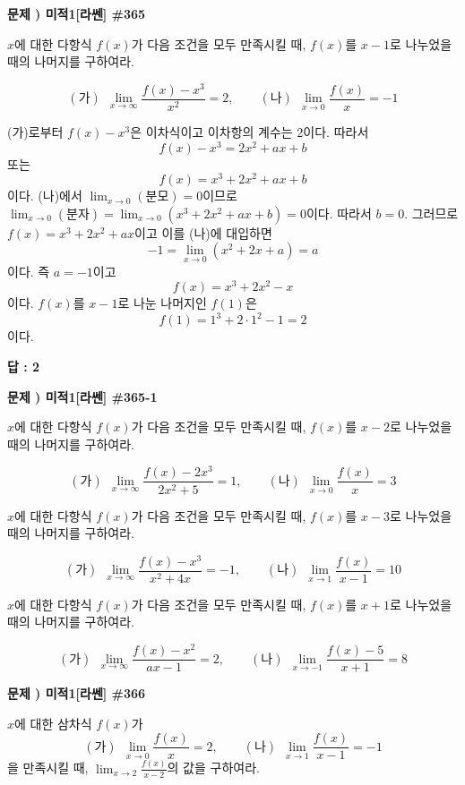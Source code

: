 \documentclass[a4paper]{oblivoir}
\newcounter{num}
\newcommand\prob[1]
{\bigskip\par\noindent\stepcounter{num} \textbf{문제 \thenum) #1}\par\noindent}
\newcommand\vs[1]{\vspace{60pt}}
\begin{document}
\clearpage
%
\prob{미적1[라쎈] \#365}
\(x\)에 대한 다항식 \(f(x)\)가 다음 조건을 모두 만족시킬 때, \(f(x)\)를 \(x-1\)로 나누었을 때의 나머지를 구하여라.
\begin{mdframed}
\[
(가)\:\:\lim_{x\to\infty}\frac{f(x)-x^3}{x^2}=2,\qquad
(나)\:\:\lim_{x\to0}\frac{f(x)}x=-1
\]
\end{mdframed}
\begin{mdframed}[frametitle=<풀이>]
(가)로부터 \(f(x)-x^3\)은 이차식이고 이차항의 계수는 2이다.
따라서 \[f(x)-x^3=2x^2+ax+b\]
또는
\[f(x)=x^3+2x^2+ax+b\tag{3}\]
이다.
(나)에서 \(\displaystyle\lim_{x\to0}(분모)=0\)이므로
\(\displaystyle\lim_{x\to0}(분자)=\lim_{x\to0}(x^3+2x^2+ax+b)=0\)이다.
따라서 \(b=0\).
그러므로 \(f(x)=x^3+2x^2+ax\)이고 이를 (나)에 대입하면
\[-1=\lim_{x\to0}(x^2+2x+a)=a\]
이다.
즉 \(a=-1\)이고
\[f(x)=x^3+2x^2-x\]
이다. \(f(x)\)를 \(x-1\)로 나눈 나머지인 \(f(1)\)은
\[f(1)=1^3+2\cdot1^2-1=2\]
이다.
\end{mdframed}
{\par
\raggedleft\textbf{답 : 2}
\par}\bigskip

\clearpage
%
\prob{미적1[라쎈] \#365-1}
\(x\)에 대한 다항식 \(f(x)\)가 다음 조건을 모두 만족시킬 때, \(f(x)\)를 \(x-2\)로 나누었을 때의 나머지를 구하여라.
\begin{mdframed}
\[
(가)\:\:\lim_{x\to\infty}\frac{f(x)-2x^3}{2x^2+5}=1,\qquad
(나)\:\:\lim_{x\to0}\frac{f(x)}{x}=3
\]
\end{mdframed}
\vs

%
\prob{미적1[라쎈] \#365-2}
\(x\)에 대한 다항식 \(f(x)\)가 다음 조건을 모두 만족시킬 때, \(f(x)\)를 \(x-3\)로 나누었을 때의 나머지를 구하여라.
\begin{mdframed}
\[
(가)\:\:\lim_{x\to\infty}\frac{f(x)-x^3}{x^2+4x}=-1,\qquad
(나)\:\:\lim_{x\to1}\frac{f(x)}{x-1}=10
\]
\end{mdframed}
\vs

%
\prob{미적1[라쎈] \#365-3}
\(x\)에 대한 다항식 \(f(x)\)가 다음 조건을 모두 만족시킬 때, \(f(x)\)를 \(x+1\)로 나누었을 때의 나머지를 구하여라.
\begin{mdframed}
\[
(가)\:\:\lim_{x\to\infty}\frac{f(x)-x^2}{ax-1}=2,\qquad
(나)\:\:\lim_{x\to-1}\frac{f(x)-5}{x+1}=8
\]
\end{mdframed}
\vs

\clearpage
%
\prob{미적1[라쎈] \#366}
\(x\)에 대한 삼차식 \(f(x)\)가
\[
(가)\:\:\lim_{x\to0}\frac{f(x)}x=2,\qquad
(나)\:\:\lim_{x\to1}\frac{f(x)}{x-1}=-1
\]
을 만족시킬 때, \(\displaystyle\lim_{x\to2}\frac{f(x)}{x-2}\)의 값을 구하여라.
\end{document}

